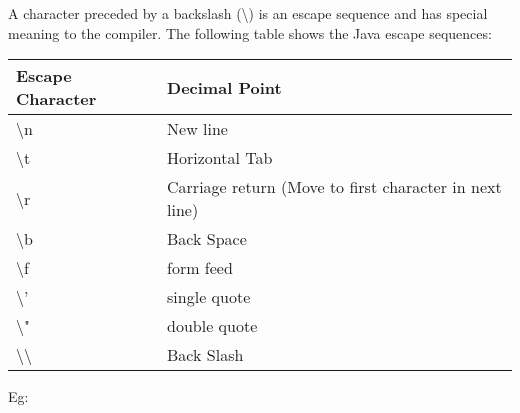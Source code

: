 
\begin{flushleft}
	
	A character preceded by a backslash (\textbackslash) is an escape sequence and has special meaning to the compiler. 
	\newline
	The following table shows the Java escape sequences:
	
	\begin{tabulary}{1.0\textwidth}{|p{12em}|p{12em}|}
		\toprule
		\textbf{Escape Character} & \textbf{Decimal Point} \\
		\midrule
		\textbackslash n & New line \\
		\hline
		\textbackslash t & Horizontal Tab \\
		\hline
		\textbackslash r & Carriage return (Move to first character in next line) \\
		\hline
		\textbackslash b & Back Space \\
		\hline
		\textbackslash f & form feed \\
		\hline
		\textbackslash ' & single quote \\
		\hline
		\textbackslash " & double quote \\
		\hline
		\textbackslash \textbackslash & Back Slash \\
		\bottomrule
	\end{tabulary}

	Eg:
	

\end{flushleft}

\newpage

